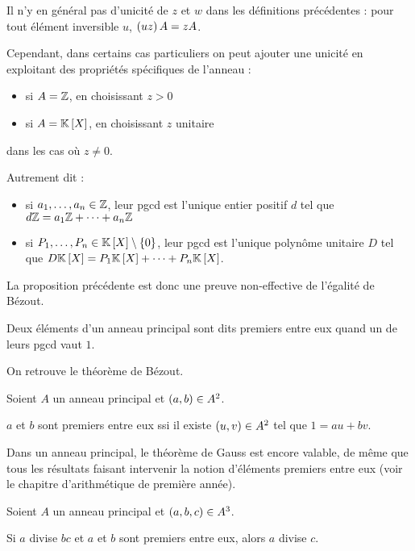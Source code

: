 Il n'y en général pas d'unicité de \(z\) et \(w\) dans les définitions précédentes : pour tout élément inversible \(u\), \(\left(uz\right)A=zA\).

Cependant, dans certains cas particuliers on peut ajouter une unicité en exploitant des propriétés spécifiques de l'anneau :

\begin{itemize}
    \item si \(A=\mathbb{Z}\), en choisissant \(z>0\) \\
    \item si \(A=\poly\), en choisissant \(z\) unitaire
\end{itemize}

dans les cas où \(z\not=0\).

Autrement dit :

\begin{itemize}
    \item si \(a_1,\dots,a_n\in\mathbb{Z}\), leur pgcd est l'unique entier positif \(d\) tel que \(d\mathbb{Z}=a_1\mathbb{Z}+\dots+a_n\mathbb{Z}\) \\
    \item si \(P_1,\dots,P_n\in\poly\excluant\accol{0}\), leur pgcd est l'unique polynôme unitaire \(D\) tel que \(D\poly=P_1\poly+\dots+P_n\poly\).
\end{itemize}

La proposition précédente est donc une preuve non-effective de l'égalité de Bézout.

\begin{defi}
Deux éléments d'un anneau principal sont dits premiers entre eux quand un de leurs pgcd vaut \(1\).
\end{defi}

On retrouve le théorème de Bézout.

\begin{theo}
Soient \(A\) un anneau principal et \(\left(a,b\right)\in A^2\).

\(a\) et \(b\) sont premiers entre eux ssi il existe \(\left(u,v\right)\in A^2\) tel que \(1=au+bv\).
\end{theo}

Dans un anneau principal, le théorème de Gauss est encore valable, de même que tous les résultats faisant intervenir la notion d'éléments premiers entre eux (voir le chapitre d'arithmétique de première année).

\begin{theo}
Soient \(A\) un anneau principal et \(\left(a,b,c\right)\in A^3\).

Si \(a\) divise \(bc\) et \(a\) et \(b\) sont premiers entre eux, alors \(a\) divise \(c\).
\end{theo}

